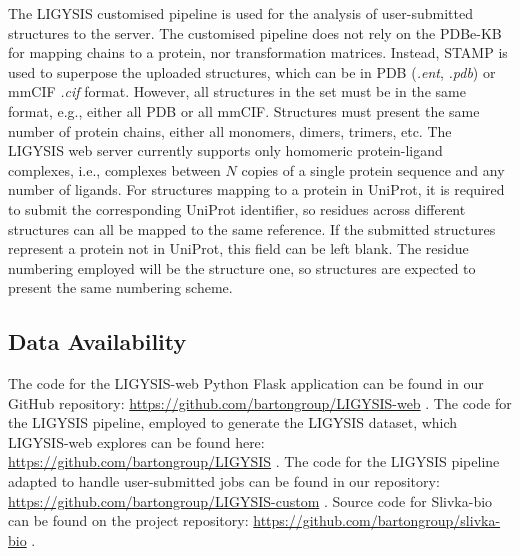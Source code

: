 The LIGYSIS customised pipeline is used for the analysis of user-submitted structures to the server. The customised pipeline does not rely on the PDBe-KB for mapping chains to a protein, nor transformation matrices. Instead, STAMP \cite{RUSSELL_1992_STAMP} is used to superpose the uploaded structures, which can be in PDB (\textit{.ent}, \textit{.pdb}) or mmCIF \textit{.cif}  format. However, all structures in the set must be in the same format, e.g., either all PDB or all mmCIF. Structures must present the same number of protein chains, either all monomers, dimers, trimers, etc. The LIGYSIS web server currently supports only homomeric protein-ligand complexes, i.e., complexes between $N$ copies of a single protein sequence and any number of ligands. For structures mapping to a protein in UniProt, it is required to submit the corresponding UniProt identifier, so residues across different structures can all be mapped to the same reference. If the submitted structures represent a protein not in UniProt, this field can be left blank. The residue numbering employed will be the structure one, so structures are expected to present the same numbering scheme.



\subsection{Data Availability}

The code for the LIGYSIS-web Python Flask application can be found in our GitHub repository: \url{https://github.com/bartongroup/LIGYSIS-web} \cite{UTGES_2024_LIGYSIS_WEB_ZENODO}. The code for the LIGYSIS pipeline, employed to generate the LIGYSIS dataset, which LIGYSIS-web explores can be found here: \url{https://github.com/bartongroup/LIGYSIS} \cite{UTGES_2024_LIGYSIS_ZENODO}. The code for the LIGYSIS pipeline adapted to handle user-submitted jobs can be found in our repository: \url{https://github.com/bartongroup/LIGYSIS-custom} \cite{UTGES_2024_LIGYSIS_CUSTOM_ZENODO}. Source code for Slivka-bio can be found on the project repository:  \url{https://github.com/bartongroup/slivka-bio} \cite{MACGOWAN_2020_DRSASP}. 


